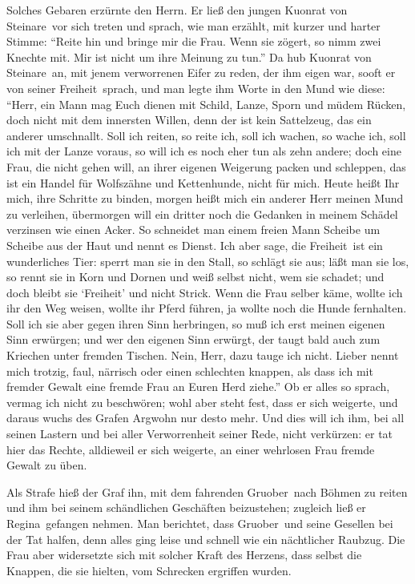Solches Gebaren erzürnte den Herrn. Er ließ den jungen \gls{Kuonrat von Steinare}\ vor sich treten und sprach, wie man erzählt, mit kurzer und harter Stimme: \enquote{Reite hin und bringe mir die Frau. Wenn sie zögert, so nimm zwei Knechte mit. Mir ist nicht um ihre Meinung zu tun.} Da hub \gls{Kuonrat von Steinare}\ an, mit jenem verworrenen Eifer zu reden, der ihm eigen war, sooft er von seiner \gls{Freiheit}\ sprach, und man legte ihm Worte in den Mund wie diese: \enquote{Herr, ein Mann mag Euch dienen mit Schild, Lanze, Sporn und müdem Rücken, doch nicht mit dem innersten Willen, denn der ist kein Sattelzeug, das ein anderer umschnallt. Soll ich reiten, so reite ich, soll ich wachen, so wache ich, soll ich mit der Lanze voraus, so will ich es noch eher tun als zehn andere; doch eine Frau, die nicht gehen will, an ihrer eigenen Weigerung packen und schleppen, das ist ein Handel für Wolfszähne und Kettenhunde, nicht für mich. Heute heißt Ihr mich, ihre Schritte zu binden, morgen heißt mich ein anderer Herr meinen Mund zu verleihen, übermorgen will ein dritter noch die Gedanken in meinem Schädel verzinsen wie einen Acker. So schneidet man einem freien Mann Scheibe um Scheibe aus der Haut und nennt es Dienst. Ich aber sage, die \gls{Freiheit}\ ist ein wunderliches Tier: sperrt man sie in den Stall, so schlägt sie aus; läßt man sie los, so rennt sie in Korn und Dornen und weiß selbst nicht, wem sie schadet; und doch bleibt sie \enquote{Freiheit} und nicht Strick. Wenn die Frau selber käme, wollte ich ihr den Weg weisen, wollte ihr Pferd führen, ja wollte noch die Hunde fernhalten. Soll ich sie aber gegen ihren Sinn herbringen, so muß ich erst meinen eigenen Sinn erwürgen; und wer den eigenen Sinn erwürgt, der taugt bald auch zum Kriechen unter fremden Tischen. Nein, Herr, dazu tauge ich nicht. Lieber nennt mich trotzig, faul, närrisch oder einen schlechten \gls{knappe}n, als dass ich mit fremder Gewalt eine fremde Frau an Euren Herd ziehe.} Ob er alles so sprach, vermag ich nicht zu beschwören; wohl aber steht fest, dass er sich weigerte, und daraus wuchs des Grafen Argwohn nur desto mehr. Und dies will ich ihm, bei all seinen Lastern und bei aller Verworrenheit seiner Rede, nicht verkürzen: er tat hier das Rechte, alldieweil er sich weigerte, an einer wehrlosen Frau fremde Gewalt zu üben.

Als Strafe hieß der Graf ihn, mit dem fahrenden \gls{Gruober}\ nach Böhmen zu reiten und ihm bei seinem schändlichen Geschäften beizustehen; zugleich ließ er \gls{Regina}\ gefangen nehmen. Man berichtet, dass \gls{Gruober}\ und seine Gesellen bei der Tat halfen, denn alles ging leise und schnell wie ein nächtlicher Raubzug. Die Frau aber widersetzte sich mit solcher Kraft des Herzens, dass selbst die Knappen, die sie hielten, vom Schrecken ergriffen wurden.

